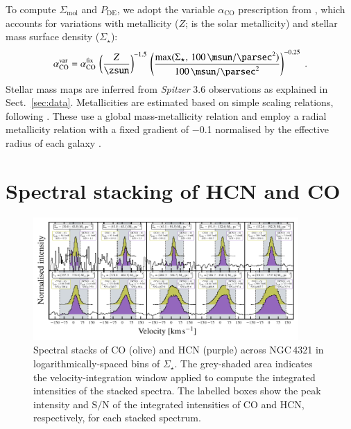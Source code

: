 \documentclass[letter, longauth]{aa} %
\newcommand*{\sigmol}{\ensuremath{\Sigma_{\text{mol}}}\xspace}  %
\newcommand*{\pde}{\ensuremath{P_{\text{DE}}}\xspace}  %
\newcommand*{\alphaco}{\ensuremath{\alpha_{\text{CO}}}\xspace}  %
\newcommand*{\sigstar}{\ensuremath{\Sigma_{\star}}\xspace}  %
\newcommand*{\snr}{\ensuremath{\mathrm{S}/\mathrm{N}}\xspace}  %
\begin{document}
\begin{appendix}
To compute \sigmol and \pde, we adopt the variable \alphaco prescription from \citet[][their Table~1]{Schinnerer2024}, which accounts for variations with metallicity ($Z$; \SI{}{\zsun} is the solar metallicity) and stellar mass surface density (\sigstar):
\begin{align}
    \alphaco^{\rm var} = \alphaco^{\rm fix} \, \left(\dfrac{Z}{\SI{}{\zsun}}\right)^{-1.5} \, \left(\dfrac{\mathrm{max}(\sigstar,\,\SI{100}{\msun\per\square\parsec})}{\SI{100}{\msun\per\square\parsec}}\right)^{-0.25} \;.
\end{align}
Stellar mass maps are inferred from \textit{Spitzer} \SI{3.6}{\micron} observations as explained in Sect.~\ref{sec:data}.
Metallicities are estimated based on simple scaling relations, following \citet{Sun2020a}.
These use a global mass-metallicity relation \citep{Sanchez2019} and employ a radial metallicity relation with a fixed gradient of \SI{-0.1}{\dex} normalised by the effective radius of each galaxy \citep{Sanchez2014}.


\section{Spectral stacking of HCN and CO}
\label{sec:app:stacking}

\begin{figure}
\centering
\includegraphics[width=0.9\textwidth]{Figures/ngc4321_almond_stacked_spectra_via_INT_VAL_SD_STAR_compressed.pdf}
\caption{Spectral stacks of CO (olive) and HCN (purple) across NGC\,4321 in logarithmically-spaced bins of \sigstar. The grey-shaded area indicates the velocity-integration window applied to compute the integrated intensities of the stacked spectra. The labelled boxes show the peak intensity and \snr of the integrated intensities of CO and HCN, respectively, for each stacked spectrum.}
\label{fig:ngc4321_stacks}
\end{figure}


\end{appendix}
\end{document}
